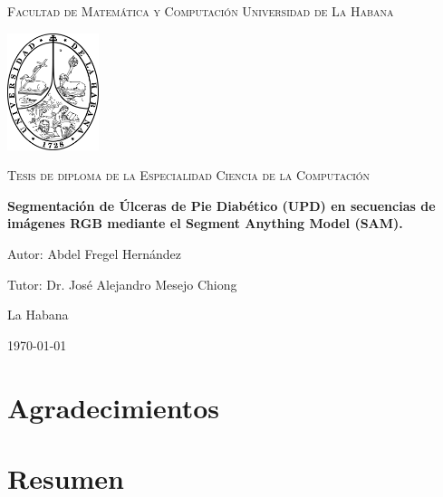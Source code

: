 \documentclass[12pt]{article}
\begin{document}
	\begin{titlepage}
		  \centering
		 
		  
		  {\scshape  \LARGE Facultad de Matemática y 
		  	Computación
		  	Universidad de La Habana\par}
		 
		  
		  \begin{center}
		  	\includegraphics[width=0.2\textwidth]{uhlogo.pdf} %
		  \end{center}
		  
		  
		  
		  {\scshape\large Tesis de diploma de la 
		  	Especialidad Ciencia de la 
		  	Computaci\'on \par}
		  \vspace{1cm}
		  
		  {\Large\bfseries Segmentaci\'on de \'Ulceras de Pie Diab\'etico (UPD) en secuencias de im\'agenes RGB mediante el Segment Anything Model (SAM). \par}
		  \vspace{1cm}
		  
		  
		  
		  {\Large Autor: Abdel Fregel Hern\'andez \par}
		  
		  \Large Tutor: Dr. Jos\'e Alejandro Mesejo Chiong
		  \vfill
		  
		  {\large La Habana}
		  
		  {\large \today \par} %
	\end{titlepage}
	
	\section{Agradecimientos}
	\newpage
	
	
	\section{Resumen}
	\newpage
	
\end{document}
